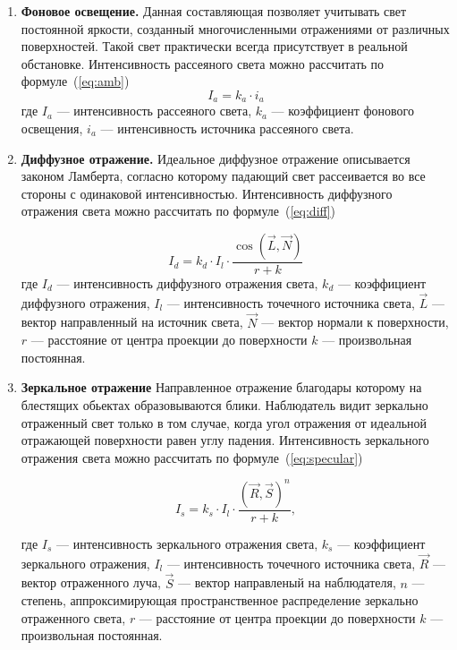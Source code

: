 \begin{enumerate}[label=\arabic*)]
	\item \textbf{Фоновое освещение.} Данная составляющая позволяет учитывать свет постоянной яркости, созданный многочисленными отражениями от различных поверхностей. Такой свет практически всегда присутствует в реальной обстановке. Интенсивность  рассеяного света можно рассчитать по формуле~(\ref{eq:amb})
	\begin{equation}\label{eq:amb}
		I_{a} = k_{a} \cdot i_{a}
	\end{equation}
	\noindent где 
	$I_{a}$ --- интенсивность рассеяного света, 
	$k_{a}$ --- коэффициент фонового освещения, 
	$i_{a}$ --- интенсивность источника рассеяного света. 
	
	\item \textbf{Диффузное отражение.} Идеальное диффузное отражение описывается законом Ламберта, согласно которому падающий свет рассеивается во все стороны с одинаковой интенсивностью. Интенсивность диффузного отражения света можно рассчитать по формуле~(\ref{eq:diff})
	
	\begin{equation}\label{eq:diff}
		I_{d} = k_{d} \cdot I_{l} \cdot \frac{\cos(\overrightarrow{L}, \overrightarrow{N})}{r + k}
	\end{equation}
	\noindent где 
	$I_{d}$ --- интенсивность диффузного отражения света, 
	$k_{d}$ --- коэффициент диффузного отражения, 
	$I_{l}$ --- интенсивность точечного источника света,
	$\overrightarrow{L}$ --- вектор направленный на источник света, 
	$\overrightarrow{N}$ --- вектор нормали к поверхности,
	$r$ --- расстояние от центра проекции до поверхности
	$k$ --- произвольная постоянная.
	
	\item \textbf{Зеркальное отражение} Направленное отражение благодары которому на блестящих обьектах образовываются блики. Наблюдатель видит зеркально отраженный свет только в том случае, когда угол отражения от идеальной отражающей поверхности равен углу падения. Интенсивность зеркального отражения света можно рассчитать по формуле~(\ref{eq:specular})
	
	\begin{equation}\label{eq:specular}
		I_{s} = k_{s} \cdot I_{l} \cdot \frac{(\overrightarrow{R}, \overrightarrow{S})^n}{r + k},
	\end{equation}
	
	\noindent где 
	$I_{s}$ --- интенсивность зеркального отражения света,
	$k_{s}$ --- коэффициент зеркального отражения,
	$I_{l}$ --- интенсивность точечного источника света,
	$\overrightarrow{R}$ --- вектор отраженного луча, 
	$\overrightarrow{S}$ --- вектор направленый на наблюдателя,
	$n$ ---  степень, аппроксимирующая пространственное распределение зеркально отраженного света,
	$r$ --- расстояние от центра проекции до поверхности
	$k$ --- произвольная постоянная.
	
	
\end{enumerate}


